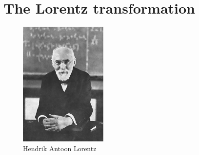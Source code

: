 \chapter{The Lorentz transformation}

\newpage
\thispagestyle{empty}

\begin{figure}[H]
\centering
\includegraphics[scale=1]{src/images/lbk-graphics/portraits/Lorentz.pdf}
\caption*{Hendrik Antoon Lorentz}
\end{figure}
